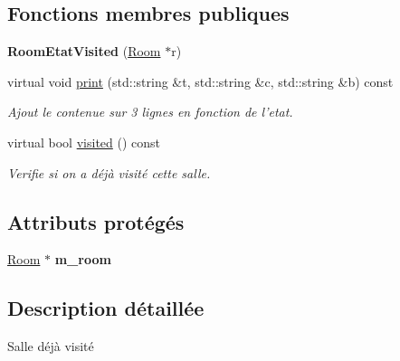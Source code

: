 \subsection*{Fonctions membres publiques}
\begin{DoxyCompactItemize}
\item 
\hypertarget{class_room_etat_visited_a5ba7ee83575795bf0f1528a037e2956b}{{\bfseries Room\-Etat\-Visited} (\hyperlink{class_room}{Room} $\ast$r)}\label{class_room_etat_visited_a5ba7ee83575795bf0f1528a037e2956b}

\item 
virtual void \hyperlink{class_room_etat_visited_a5c4482da22bbc5f090c9db7be1eb882d}{print} (std\-::string \&t, std\-::string \&c, std\-::string \&b) const 
\begin{DoxyCompactList}\small\item\em Ajout le contenue sur 3 lignes en fonction de l'etat. \end{DoxyCompactList}\item 
virtual bool \hyperlink{class_room_etat_visited_a7d8f9d29a61c766c879aeff49cd391cc}{visited} () const 
\begin{DoxyCompactList}\small\item\em Verifie si on a déjà visité cette salle. \end{DoxyCompactList}\end{DoxyCompactItemize}
\subsection*{Attributs protégés}
\begin{DoxyCompactItemize}
\item 
\hypertarget{class_room_etat_a5b23317f60b9d268bbe669955b3c4725}{\hyperlink{class_room}{Room} $\ast$ {\bfseries m\-\_\-room}}\label{class_room_etat_a5b23317f60b9d268bbe669955b3c4725}

\end{DoxyCompactItemize}


\subsection{Description détaillée}
Salle déjà visité 


